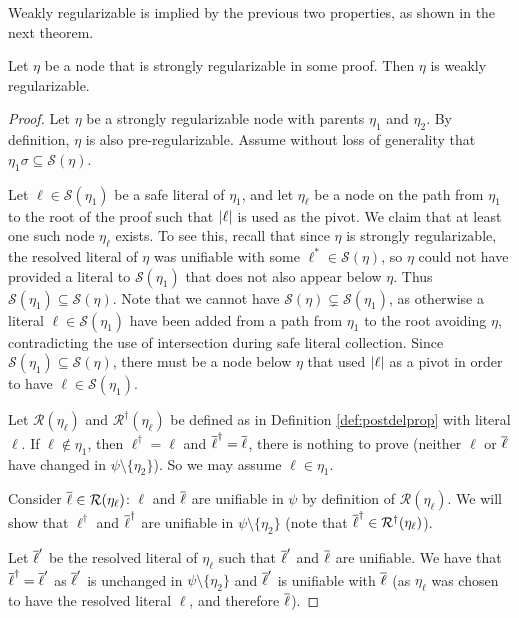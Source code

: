 Weakly regularizable is implied by the previous two properties, as shown in the next theorem.

\begin{thm}
Let $\eta$ be a node that is strongly regularizable in some proof. Then $\eta$ is weakly regularizable.
\end{thm}

\begin{proof}
Let $\eta$ be a strongly regularizable node with parents $\eta_1$ and $\eta_2$. By definition, $\eta$ is also pre-regularizable.
Assume without loss of generality that $\eta_1\sigma \subseteq \mathcal{S}(\eta)$.


Let $\ell \in \mathcal{S}(\eta_1)$ be a safe literal of $\eta_1$, and let $\eta_\ell$ be a node on the path from $\eta_1$ to the root of the proof such that $\lvert\ell\rvert$ is used as the pivot. We claim that at least one such node $\eta_\ell$ exists. To see this, recall that since $\eta$ is strongly regularizable, the resolved literal of $\eta$ was unifiable with some $\ell^*\in \mathcal{S}(\eta)$, so $\eta$ could not have provided a literal to $\mathcal{S}(\eta_1)$ that does not also appear below $\eta$. Thus $\mathcal{S}(\eta_1)\subseteq \mathcal{S}(\eta)$. Note that we cannot have $\mathcal{S}(\eta)\subsetneq \mathcal{S}(\eta_1)$, as otherwise a literal $\ell \in \mathcal{S}(\eta_1)$ have been added from a path from $\eta_1$ to the root avoiding $\eta$, contradicting the use of intersection during safe literal collection. 
Since $\mathcal{S}(\eta_1)\subseteq \mathcal{S}(\eta)$, there must be a node below $\eta$ that used $\lvert\ell\rvert$ as a pivot in order to have $\ell \in \mathcal{S}(\eta_1)$. 

Let $\mathcal{R}(\eta_\ell)$ and $\mathcal{R}^\dagger(\eta_\ell)$ be defined as in Definition \ref{def:postdelprop} with literal $\ell$.
If $\ell \notin \eta_1$, then $\ell^\dagger =\ell$ and $\overline{\ell}^\dagger=\overline{\ell}$, there is nothing to prove (neither $\ell$ or $\overline{\ell}$ have changed in $\psi\setminus\{\eta_2\}$). So we may assume $\ell\in \eta_1$.

Consider $\overline{\ell} \in \mathcal{R}(\eta_\ell)$: $\ell$ and $\overline{\ell}$ are unifiable in $\psi$ by definition of $\mathcal{R}(\eta_\ell)$. We will show that $\ell^\dagger$ and $\overline{\ell}^\dagger$ are unifiable in $\psi\setminus\{\eta_2\}$ (note that $\overline{\ell}^\dagger\in \mathcal{R}^\dagger(\eta_\ell)$). 



 
Let $\overline{\ell}'$ be the resolved literal of $\eta_\ell$ such that $\overline{\ell}'$ and $\overline{\ell}$ are unifiable.
We have that $\overline{\ell}^\dagger=\overline{\ell}'$ as $\overline{\ell}'$ is unchanged in $\psi \setminus\{\eta_2\}$ and $\overline{\ell}'$ is unifiable with $\overline{\ell}$ (as $\eta_\ell$ was chosen to have the resolved literal $\ell$, and therefore $\overline{\ell}$).




\end{proof}
